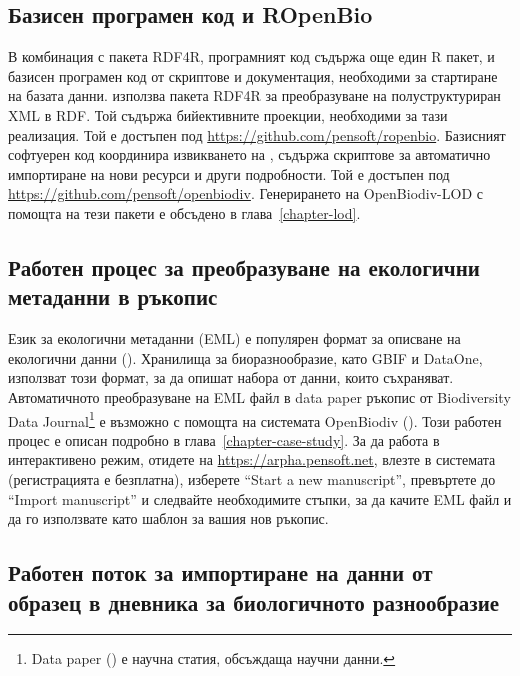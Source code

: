 \subsection{Базисен програмен код и ROpenBio}

В комбинация с пакета RDF4R, програмният код съдържа още един R пакет,  и базисен програмен код от скриптове и документация, необходими за стартиране на базата данни.  използва пакета RDF4R за преобразуване на полуструктуриран XML в RDF. Той съдържа бийективните проекции, необходими за тази реализация. Той е достъпен под \url{https://github.com/pensoft/ropenbio}. Базисният софтуерен код координира извикването на , съдържа скриптове за автоматично импортиране на нови ресурси и други подробности. Той е достъпен под \url{https://github.com/pensoft/openbiodiv}. Генерирането на OpenBiodiv-LOD с помощта на тези пакети е обсъдено в глава~\ref{chapter-lod}.

\subsection{Работен процес за преобразуване на екологични метаданни в ръкопис}

Език за екологични метаданни (EML) е популярен формат за описване на екологични данни (\cite{michener_nongeospatial_1997}). Хранилища за биоразнообразие, като GBIF и DataOne, използват този формат, за да опишат набора от данни, които съхраняват. Автоматичното преобразуване на EML файл в data paper ръкопис от Biodiversity Data Journal\footnote {Data paper (\cite{chavan_data_2011}) е научна статия, обсъждаща научни данни.} е възможно с помощта на системата OpenBiodiv (\cite{senderov_online_2016}). Този работен процес е описан подробно в глава~\ref{chapter-case-study}. За да работа в интерактивено режим, отидете на \url{https://arpha.pensoft.net}, влезте в системата (регистрацията е безплатна), изберете ``Start a new manuscript'', превъртете до ``Import manuscript'' и следвайте необходимите стъпки, за да качите EML файл и да го използвате като шаблон за вашия нов ръкопис.

\subsection{Работен поток за импортиране на данни от образец в дневника за биологичното разнообразие}

